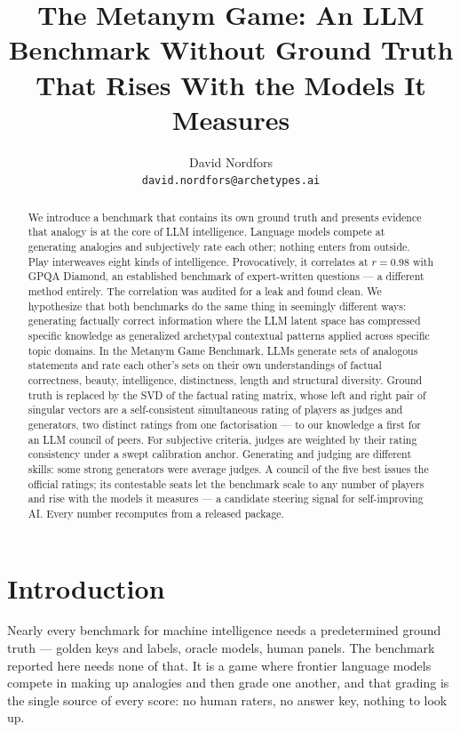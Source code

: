 \documentclass{article}
\title{The Metanym Game: An LLM Benchmark Without Ground Truth That Rises With the Models It Measures}
\author{David Nordfors \\ \texttt{david.nordfors@archetypes.ai}}
\begin{document}
\maketitle
{}
\begin{abstract}

We introduce a benchmark that contains its own ground truth and presents evidence that analogy is at the core of LLM intelligence. Language models compete at generating analogies and subjectively rate each other; nothing enters from outside. Play interweaves eight kinds of intelligence. Provocatively, it correlates at \(r = 0.98\) with GPQA Diamond, an established benchmark of expert-written questions --- a different method entirely. The correlation was audited for a leak and found clean. We hypothesize that both benchmarks do the same thing in seemingly different ways: generating factually correct information where the LLM latent space has compressed specific knowledge as generalized archetypal contextual patterns applied across specific topic domains. In the Metanym Game Benchmark, LLMs generate sets of analogous statements and rate each other's sets on their own understandings of factual correctness, beauty, intelligence, distinctness, length and structural diversity. Ground truth is replaced by the SVD of the factual rating matrix, whose left and right pair of singular vectors are a self-consistent simultaneous rating of players as judges and generators, two distinct ratings from one factorisation --- to our knowledge a first for an LLM council of peers. For subjective criteria, judges are weighted by their rating consistency under a swept calibration anchor. Generating and judging are different skills: some strong generators were average judges. A council of the five best issues the official ratings; its contestable seats let the benchmark scale to any number of players and rise with the models it measures --- a candidate steering signal for self-improving AI. Every number recomputes from a released package.

\end{abstract}
\section{Introduction}\label{introduction}

Nearly every benchmark for machine intelligence needs a predetermined ground truth --- golden keys and labels, oracle models, human panels. The benchmark reported here needs none of that. It is a game where frontier language models compete in making up analogies and then grade one another, and that grading is the single source of every score: no human raters, no answer key, nothing to look up.
\end{document}
